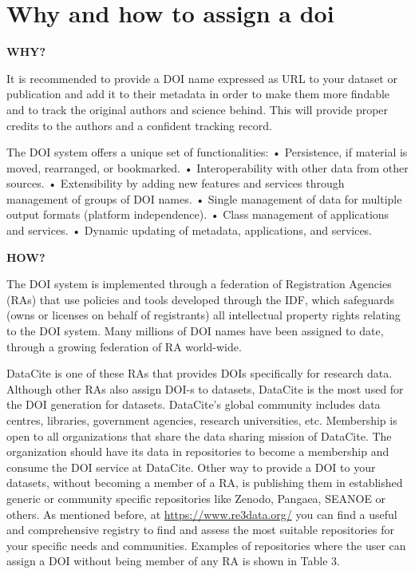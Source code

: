 \documentclass[
]{book}
\begin{document}
\hypertarget{why-and-how-to-assign-a-doi}{%
\chapter{Why and how to assign a doi}\label{why-and-how-to-assign-a-doi}}

\textbf{WHY?}

It is recommended to provide a DOI name expressed as URL to your dataset or publication and add it to their metadata in order to make them more findable and to track the original authors and science behind. This will provide proper credits to the authors and a confident tracking record.

The DOI system offers a unique set of functionalities:
• Persistence, if material is moved, rearranged, or bookmarked.
• Interoperability with other data from other sources.
• Extensibility by adding new features and services through management of groups of DOI names.
• Single management of data for multiple output formats (platform independence).
• Class management of applications and services.
• Dynamic updating of metadata, applications, and services.

\textbf{HOW?}

The DOI system is implemented through a federation of Registration Agencies (RAs) that use policies and tools developed through the IDF, which safeguards (owns or licenses on behalf of registrants) all intellectual property rights relating to the DOI system. Many millions of DOI names have been assigned to date, through a growing federation of RA world-wide.

DataCite is one of these RAs that provides DOIs specifically for research data. Although other RAs also assign DOI-s to datasets, DataCite is the most used for the DOI generation for datasets. DataCite's global community includes data centres, libraries, government agencies, research universities, etc. Membership is open to all organizations that share the data sharing mission of DataCite. The organization should have its data in repositories to become a membership and consume the DOI service at DataCite. Other way to provide a DOI to your datasets, without becoming a member of a RA, is publishing them in established generic or community specific repositories like Zenodo, Pangaea, SEANOE or others. As mentioned before, at \url{https://www.re3data.org/} you can find a useful and comprehensive registry to find and assess the most suitable repositories for your specific needs and communities. Examples of repositories where the user can assign a DOI without being member of any RA is shown in Table 3.
\end{document}
